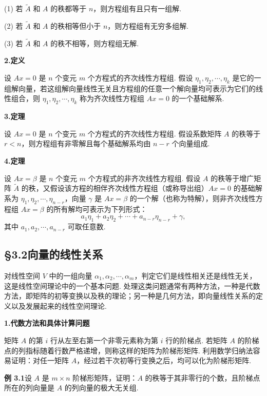 \documentclass[UTF8, 12pt, fontset=fandol, oneside]{ctexart}
\begin{document}
(1) 若 $\widetilde A$ 和 $A$ 的秩都等于 $n$，则方程组有且只有一组解.

(2) 若 $\widetilde A$ 和 $A$ 的秩相等但小于 $n$，则方程组有无穷多组解.

(3) 若 $\widetilde A$ 和 $A$ 的秩不相等，则方程组无解.

\noindent\textbf{2.\quad 定义}

设 $Ax=0$ 是 $n$ 个变元 $m$ 个方程式的齐次线性方程组. 假设 $\eta_1,\eta_2,\cdots,\eta_k$ 是它的一组解向量，若这组解向量线性无关且方程组的任意一个解向量均可表示为它们的线性组合，则 $\eta_1,\eta_2,\cdots,\eta_k$ 称为齐次线性方程组 $Ax=0$ 的一个基础解系.

\noindent\textbf{3.\quad 定理}

设 $Ax=0$ 是 $n$ 个变元 $m$ 个方程式的齐次线性方程组. 假设系数矩阵 $A$ 的秩等于 $r<n$，则方程组有非零解且每个基础解系均由 $n-r$ 个向量组成.

\noindent\textbf{4.\quad 定理}

设 $Ax=\beta$ 是 $n$ 个变元 $m$ 个方程式的非齐次线性方程组. 假设 $A$ 的秩等于增广矩阵 $\widetilde A$ 的秩，又假设该方程的相伴齐次线性方程组（或称导出组）$Ax=0$ 的基础解系为 $\eta_1,\eta_2,\cdots,\eta_{n-r}$，向量 $\gamma$ 是 $Ax=\beta$ 的一个解（也称为特解），则非齐次线性方程组 $Ax=\beta$ 的所有解均可表示为下列形式：
\[
a_1\eta_1+a_2\eta_2+\cdots+a_{n-r}\eta_{n-r}+\gamma,
\]
其中 $a_1,a_2,\cdots,a_{n-r}$ 可取任意数.

\subsection*{§3.2\quad 向量的线性关系}

对线性空间 $V$ 中的一组向量 $\alpha_1,\alpha_2,\cdots,\alpha_m$，判定它们是线性相关还是线性无关，这是线性空间理论中的一个基本问题. 处理这类问题通常有两种方法，一种是代数方法，即矩阵的初等变换以及秩的理论；另一种是几何方法，即向量线性关系的定义以及发展起来的线性空间理论.

\noindent\textbf{1.\quad 代数方法和具体计算问题}

矩阵 $A$ 的第 $i$ 行从左至右第一个非零元素称为第 $i$ 行的阶梯点. 若矩阵 $A$ 的阶梯点的列指标随着行数严格递增，则称这样的矩阵为阶梯形矩阵. 利用数学归纳法容易证明：对任一矩阵 $A$，经过若干次初等行变换之后，均可以化为阶梯形矩阵.

\noindent\textbf{例 3.1}\quad 设 $A$ 是 $m\times n$ 阶梯形矩阵，证明：$A$ 的秩等于其非零行的个数，且阶梯点所在的列向量是 $A$ 的列向量的极大无关组.
\end{document}
